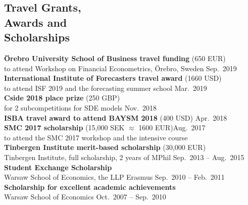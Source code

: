 \documentclass[margin,line]{resume}
\begin{document}
\begin{resume}
\section{\mysidestyle Travel Grants,\\Awards and \\ Scholarships}	
   	\textbf{\"{O}rebro University School of Business travel funding} (650 EUR) \\
    to attend Workshop on Financial Econometrics, \"{O}rebro, Sweden
   	\hfill Sep.\ 2019 \vspace{1.5mm} \\    	\textbf{International Institute of Forecasters travel award} (1660 USD)\\
    to attend ISF 2019 and the forecasting summer school%
   	\hfill Mar.\ 2019 \vspace{1.5mm} \\ 
   	\textbf{Cside 2018  place  prize} (250 GBP) \\
   	for 2 subcompetitions for SDE models%
   	 \hfill Nov.\ 2018 \vspace{1.5mm} \\ 
   	\textbf{ISBA travel award to attend BAYSM 2018} (400 USD)  \hfill Apr.\ 2018 \vspace{1.5mm} \\ %
   	\textbf{SMC 2017 scholarship} (15,000 SEK $\approx$ 1600 EUR)\hfill Aug.\ 2017  \\  to attend the SMC 2017 workshop and the intensive course \vspace{1.5mm}\\ %
   	\textbf{Tinbergen Institute merit-based scholarship} (30,000 EUR) \\ 
   	Tinbergen Institute, full scholarship, 2 years of MPhil%
   	\hfill Sep.\ 2013 -- Aug.\ 2015\vspace{1.5mm} \\   	   	
       \textbf{Student Exchange Scholarship}\\  Warsaw School of Economics, the LLP Erasmus \hfill Sep.\ 2010 -- Feb.\ 2011\vspace{1.5mm} \\
       \textbf{Scholarship for excellent academic achievements}\\ Warsaw School of Economics \hfill Oct.\ 2007 -- Sep.\ 2010 
       

\end{resume}
\end{document}
